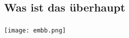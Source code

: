 \subsection{Was ist das überhaupt}
\begin{frame}
	\frametitle{\secname}
	\framesubtitle{\subsecname}
	\texttt{[image: embb.png]}
\end{frame}